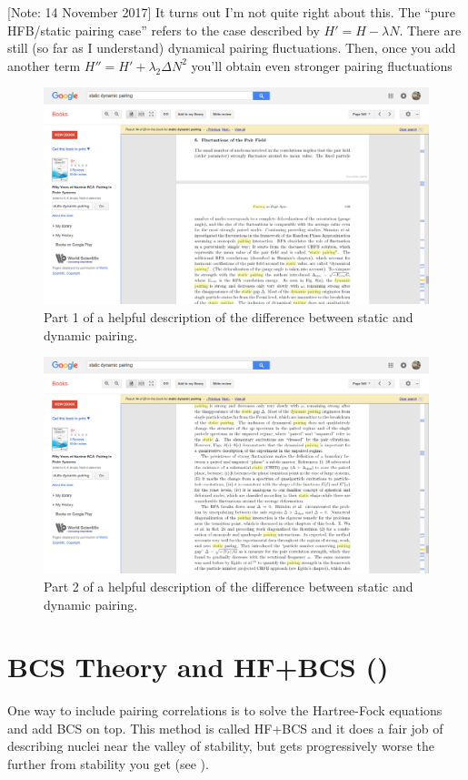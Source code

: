 [Note: 14 November 2017] It turns out I'm not quite right about this. The ``pure HFB/static pairing case'' refers to the case described by $H' = H - \lambda N$. There are still (so far as I understand) dynamical pairing fluctuations. Then, once you add another term $H'' = H' + \lambda_2 \Delta N^2$ you'll obtain even stronger pairing fluctuations

\begin{figure}
\centering
\includegraphics[width=0.7\linewidth]{TeX_files/static_dynamic_pairing1}
\caption{Part 1 of a helpful description of the difference between static and dynamic pairing.}
\label{fig:static_dynamic_pairing1}
\end{figure}

\begin{figure}
\centering
\includegraphics[width=0.7\linewidth]{TeX_files/static_dynamic_pairing2}
\caption{Part 2 of a helpful description of the difference between static and dynamic pairing.}
\label{fig:static_dynamic_pairing2}
\end{figure}


\section*{BCS Theory and HF+BCS (\cite{suhonen2007nucleons,Anguiano2013})}
One way to include pairing correlations is to solve the Hartree-Fock equations and add BCS on top. This method is called HF+BCS and it does a fair job of describing nuclei near the valley of stability, but gets progressively worse the further from stability you get (see \cite{Anguiano2013}).

